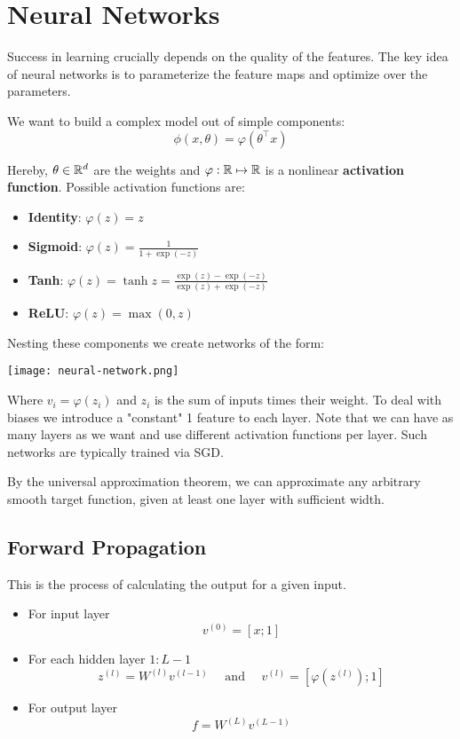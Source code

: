 \section{Neural Networks}

Success in learning crucially depends on the quality of the features. The key idea of neural networks is to parameterize the feature maps and optimize over the parameters.

We want to build a complex model out of simple components:
$$\phi(x, \theta) = \varphi(\theta^\top x)$$

Hereby, $\theta \in \mathbb{R}^d$ are the weights and $\varphi: \mathbb{R} \mapsto \mathbb{R}$ is a nonlinear \textbf{activation function}. Possible activation functions are:
\begin{itemize}
	\item \textbf{Identity}: $\varphi(z) = z$
	\item \textbf{Sigmoid}: $\varphi(z) = \frac{1}{1 + \exp(-z)}$
	\item \textbf{Tanh}: $\varphi(z) = \tanh z = \frac{\exp(z) - \exp(-z)}{\exp(z) + \exp(-z)}$
	\item \textbf{ReLU}: $\varphi(z) = \max (0,z)$
\end{itemize}

Nesting these components we create networks of the form:

\texttt{[image: neural-network.png]}

Where $v_i = \varphi(z_i)$ and $z_i$ is the sum of inputs times their weight. To deal with biases we introduce a "constant" 1 feature to each layer. Note that we can have as many layers as we want and use different activation functions per layer. Such networks are typically trained via SGD.

By the universal approximation theorem, we can approximate any arbitrary smooth target function, given at least one layer with sufficient width.

\subsection{Forward Propagation}

This is the process of calculating the output for a given input.
\begin{itemize}
	\item For input layer 
		  $$v^{(0)} = [x; 1]$$
	\item For each hidden layer $1:L-1$
		  $$z^{(l)} = W^{(l)} v^{(l-1)} \quad \text{ and } \quad v^{(l)} = [\varphi(z^{(l)}); 1]$$
	\item For output layer
		  $$f = W^{(L)} v^{(L-1)}$$
\end{itemize}

